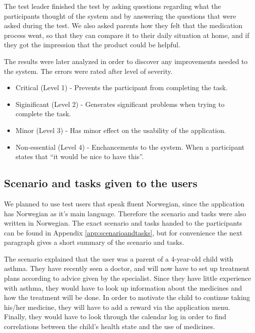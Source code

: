 The test leader finished the test by asking questions regarding what the participants thought of the system and by answering the questions that were asked during the test. We also asked parents how they felt that the medication process went, so that they can compare it to their daily situation at home, and if they got the impression that the product could be helpful.  

The results were later analyzed in order to discover any improvements needed to the system. The errors were rated after level of severity\cite{dumas1995practical}. 

\begin{itemize}
\item{Critical (Level 1) - Prevents the participant from completing the task.}
\item{Siginificant (Level 2) - Generates significant problems when trying to complete the task.}
\item{Minor (Level 3) - Has minor effect on the usability of the application.}
\item{Non-essential (Level 4) - Enchancements to the system. When a participant states that ``it would be nice to have this''.}
\end{itemize}



\subsection{Scenario and tasks given to the users}
We planned to use test users that speak fluent Norwegian, since the application has Norwegian as it's main language. Therefore the scenario and tasks were also written in Norwegian. The exact scenario and tasks handed to the participants can be found in Appendix \ref{app:scenarioandtasks}, but for convenience the next paragraph gives a short summary of the scenario and tasks.

The scenario explained that the user was a parent of a 4-year-old child with asthma. They have recently seen a doctor, and will now have to set up treatment plans according to advice given by the specialist. Since they have little experience with asthma, they would have to look up information about the medicines and how the treatment will be done. In order to motivate the child to continue taking his/her medicine, they will have to add a reward via the application menu. Finally, they would have to look through the calendar log in order to find correlations between the child's health state and the use of medicines. 
